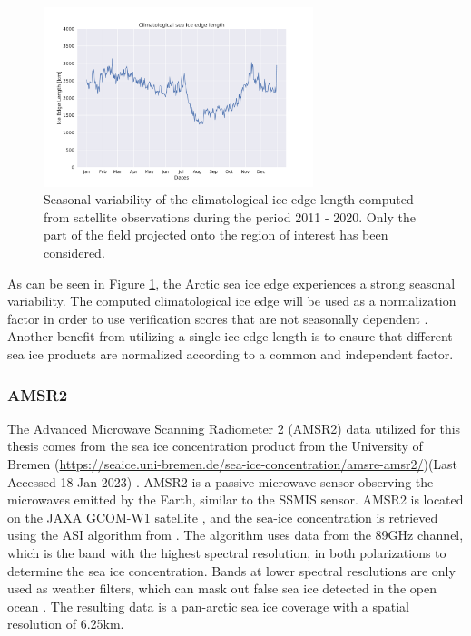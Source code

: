 \documentclass[../main/thesis.tex]{subfiles}
\begin{document}
\begin{figure}
    \centering
    \includegraphics[width = 0.7\textwidth]{clim_iceedge.pdf}
    \caption{\label{fig:clim_iceedge} Seasonal variability of the climatological ice edge length computed from satellite observations during the period 2011 - 2020. Only the part of the field projected onto the region of interest has been considered.}
\end{figure}

As can be seen in Figure \ref{fig:clim_iceedge}, the Arctic sea ice edge experiences a strong seasonal variability. The computed climatological ice edge will be used as a normalization factor in order to use verification scores that are not seasonally dependent \citep{Goessling2016, Zampieri2019, Palerme2019}. Another benefit from utilizing a single ice edge length is to ensure that different sea ice products are normalized according to a common and independent factor.

\subsubsection{AMSR2}
\label{sec:amsr2}
The Advanced Microwave Scanning Radiometer 2 (AMSR2) data utilized for this thesis comes from the sea ice concentration product from the University of Bremen (\url{https://seaice.uni-bremen.de/sea-ice-concentration/amsre-amsr2/})(Last Accessed 18 Jan 2023) \citep{Spreen2008}. AMSR2 is a passive microwave sensor observing the microwaves emitted by the Earth, similar to the SSMIS sensor. AMSR2 is located on the JAXA GCOM-W1 satellite \cite{Melsheimer2019}, and the sea-ice concentration is retrieved using the ASI algorithm from \cite{Spreen2008}. The algorithm uses data from the 89GHz channel, which is the band with the highest spectral resolution, in both polarizations to determine the sea ice concentration. Bands at lower spectral resolutions are only used as weather filters, which can mask out false sea ice detected in the open ocean \cite{Spreen2008}. The resulting data is a pan-arctic sea ice coverage with a spatial resolution of 6.25km.
\end{document}
